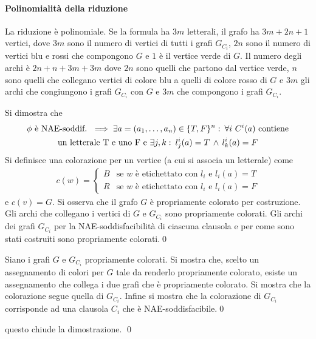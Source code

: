 \begin{demonstration}
	\paragraph{Polinomialità della riduzione}La riduzione è polinomiale. Se la formula ha $3m$ letterali, il grafo ha $3m+2n+1$ vertici, dove $3m$ sono il numero di vertici di tutti i grafi $G_{C_i}$, $2n$ sono il numero di vertici blu e rossi che compongono $G$ e $1$ è il vertice verde di $G$. Il numero degli archi è  $2n+n+3m+3m$ dove $2n$ sono quelli che partono dal vertice verde, $n$ sono quelli che collegano vertici di colore blu a quelli di colore rosso di $G$ e $3m$ gli archi che congiungono i grafi $G_{C_i}$ con $G$ e $3m$ che compongono i grafi $G_{C_i}$.
	\begin{demonstration}[$\implies$]
		Si dimostra che 
		\begin{gather*}
			\phi\ \text{è NAE-soddif.}\ \implies\exists a=(a_1,\dots,a_n)\in\{T,F\}^n \tc\forall i\ C^i(a)\ \text{contiene}\\\text{un letterale T e uno F e}\ \exists j,k\tc l^i_j(a)=T\ive l^i_k(a)=F
		\end{gather*}
		Si definisce una colorazione per un vertice (a cui si associa un letterale) come 
		\begin{gather*}
			c(w)=\begin{cases}
				B&\text{se $w$ è etichettato con $l_i$ e $l_i(a)=T$}\\
				R&\text{se $w$ è etichettato con $l_i$ e $l_i(a)=F$}
			\end{cases}
		\end{gather*}
		e $c(v)=G$. Si osserva che il grafo $G$ è propriamente colorato per costruzione. Gli archi che collegano i vertici di $G$ e $G_{C_i}$ sono propriamente colorati. Gli archi dei grafi $G_{C_i}$ per la NAE-soddisfacibilità di ciascuna clausola e per come sono stati costruiti sono propriamente colorati.\qed
	\end{demonstration}
	\begin{demonstration}[$\impliedby$]
		Siano i grafi $G$ e $G_{C_i}$ propriamente colorati. Si mostra che, scelto un assegnamento di colori per $G$ tale da renderlo propriamente colorato, esiste un assegnamento che collega i due grafi che è propriamente colorato. Si mostra che la colorazione segue quella di $G_{C_i}$. Infine si mostra che la colorazione di $G_{C_i}$ corrisponde ad una clausola $C_i$ che è NAE-soddisfacibile.\qed
	\end{demonstration}
	questo chiude la dimostrazione. \qed
\end{demonstration}